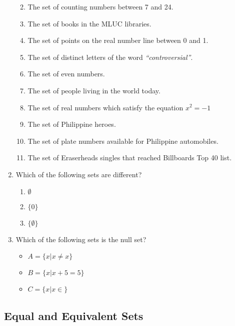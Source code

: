 \documentclass[]{book}
\providecommand{\tightlist}{%
  \setlength{\itemsep}{0pt}\setlength{\parskip}{0pt}}
\theoremstyle{definition}
\theoremstyle{definition}
\theoremstyle{definition}
\theoremstyle{remark}
\begin{document}
\begin{enumerate}
  \begin{enumerate}
  \def\labelenumii{(\alph{enumii})}
  \tightlist
  \item
    The set of counting numbers between 7 and 24.
  \item
    The set of books in the MLUC libraries.
  \item
    The set of points on the real number line between 0 and 1.
  \item
    The set of distinct letters of the word \emph{``controversial''}.
  \item
    The set of even numbers.
  \item
    The set of people living in the world today.
  \item
    The set of real numbers which satisfy the equation \(x^2=-1\)
  \item
    The set of Philippine heroes.
  \item
    The set of plate numbers available for Philippine automobiles.
  \item
    The set of Eraserheads singles that reached Billboards Top 40 list.
  \end{enumerate}
\item
  Which of the following sets are different?

  \begin{enumerate}
  \def\labelenumii{(\alph{enumii})}
  \tightlist
  \item
    \(\emptyset\)\\
  \item
    \(\{0\}\)\\
  \item
    \(\{ \emptyset \}\)\\
  \end{enumerate}
\item
  Which of the following sets is the null set?

  \begin{itemize}
  \tightlist
  \item
    \(A = \{x|x \neq x\}\)\\
  \item
    \(B = \{x|x+5 = 5 \}\)\\
  \item
    \(C = \{x|x \in \}\)
  \end{itemize}
\end{enumerate}

\hypertarget{equal-and-equivalent-sets}{%
\subsection*{Equal and Equivalent Sets}\label{equal-and-equivalent-sets}}
\end{document}
